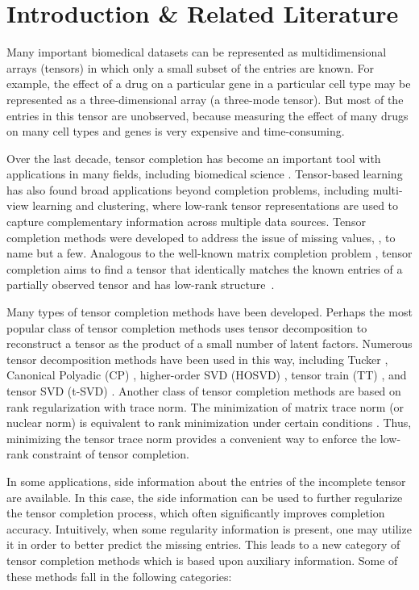 \documentclass{article}
\begin{document}
\section{Introduction \&  Related Literature}

Many important biomedical datasets can be represented as multidimensional arrays (tensors) in which only a small subset of the entries are known. For example, the effect of a drug on a particular gene in a particular cell type may be represented as a three-dimensional array (a three-mode tensor). But most of the entries in this tensor are unobserved, because measuring the effect of many drugs on many cell types and genes is very expensive and time-consuming. 

Over the last decade, tensor completion has become an important tool with applications in many fields, including biomedical science \cite{cichocki2015tensor}. Tensor-based learning has also found broad applications beyond completion problems, including multi-view learning and clustering, where low-rank tensor representations are used to capture complementary information across multiple data sources. Tensor completion methods were developed to address the issue of missing values, \cite{bagherian2021coupled}, to name but a few. Analogous to the well-known matrix completion problem \cite{davenport2016overview}, tensor completion aims to find a tensor that identically matches the known entries of a partially observed tensor and has low-rank structure~\cite{bi2020tensors}. 

Many types of tensor completion methods have been developed. Perhaps the most popular class of tensor completion methods uses tensor decomposition to reconstruct a tensor as the product of a small number of latent factors. Numerous tensor decomposition methods have been used in this way, including Tucker \cite{tucker64extension}, Canonical Polyadic (CP) \cite{carroll1970analysis}, higher-order SVD (HOSVD) \cite{de2000multilinear}, tensor train (TT) \cite{oseledets2011tensor}, and tensor SVD (t-SVD) \cite{kilmer2013third}. Another class of tensor completion methods are based on rank regularization with {trace norm}. The minimization of matrix trace norm (or nuclear norm) is equivalent to rank minimization under certain conditions \cite{candes2012exact}. 
Thus, minimizing the tensor trace norm provides a convenient way to enforce the low-rank constraint of tensor completion.


In some applications, side information about the entries of the incomplete tensor are available. In this case, the side information can be used to further regularize the tensor completion process, which often significantly improves completion accuracy. Intuitively, when some regularity information is present, one may utilize it in order to better predict the missing entries. This leads to a new category of tensor completion methods which is based upon auxiliary information. Some of these methods fall in the following categories:
\end{document}

